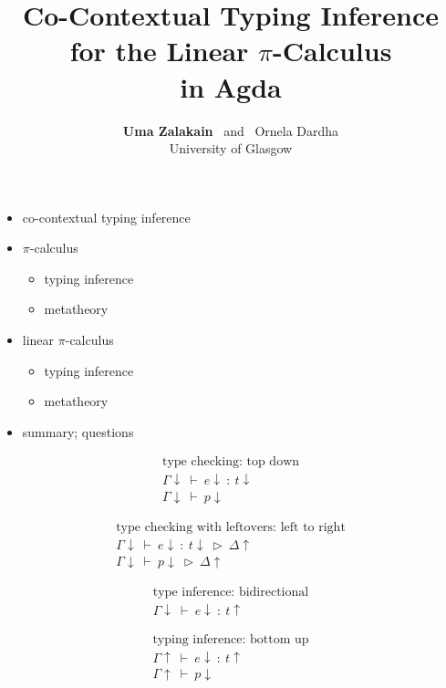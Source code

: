 \documentclass[dvipsnames]{beamer}
\title{Co-Contextual Typing Inference \\ for the Linear \(\pi\)-Calculus \\ in Agda}
\author{\textbf{Uma Zalakain} \ and \  Ornela Dardha \\ University of Glasgow}
\date{}
\newcommand{\sitem}{\item[\raisebox{.45ex}{\rule{.6ex}{.6ex}}]}
\theoremstyle{definition}\newtheorem{mytheorem}{Theorem}[section]
\newcommand{\picalc}{$\pi$-calculus}
\newcommand{\typeExpr}[3]{#1 ~ \vdash{} ~ #2 ~ : ~ #3}
\newcommand{\typeProc}[2]{#1 ~ \vdash{} ~ #2}
\begin{document}
\maketitle

\begin{frame}
  \begin{itemize}
    \setlength\itemsep{1em}
    \sitem co-contextual typing inference
    \sitem \picalc{}
      \begin{itemize}
        \sitem typing inference
        \sitem metatheory
      \end{itemize}
    \sitem linear \picalc{}
    \begin{itemize}
      \sitem typing inference
      \sitem metatheory
    \end{itemize}
    \sitem summary; questions
  \end{itemize}
\end{frame}

\begin{frame}
\[
\begin{gathered}
\text{type checking: top down} \\
\typeExpr{\Gamma \downarrow}{e \downarrow}{t \downarrow} \\
\typeProc{\Gamma \downarrow}{p \downarrow}
\end{gathered}
\]
\end{frame}

\begin{frame}
\[
\begin{gathered}
\text{type checking with leftovers: left to right} \\
\typeExpr{\Gamma \downarrow}{e \downarrow}{t \downarrow} ~ \triangleright{} ~ \Delta \uparrow \\
\typeProc{\Gamma \downarrow}{p \downarrow} ~ \triangleright{} ~ \Delta \uparrow 
\end{gathered}
\]
\end{frame}

\begin{frame}
\[
\begin{gathered}
\text{type inference: bidirectional} \\
\typeExpr{\Gamma \downarrow}{e \downarrow}{t \uparrow}
\end{gathered}
\]
\end{frame}

\begin{frame}
\[
\begin{gathered}
\text{typing inference: bottom up} \\
\typeExpr{\Gamma \uparrow}{e \downarrow}{t \uparrow}\\
\typeProc{\Gamma \uparrow}{p \downarrow}
\end{gathered}
\]
\end{frame}
\end{document}
